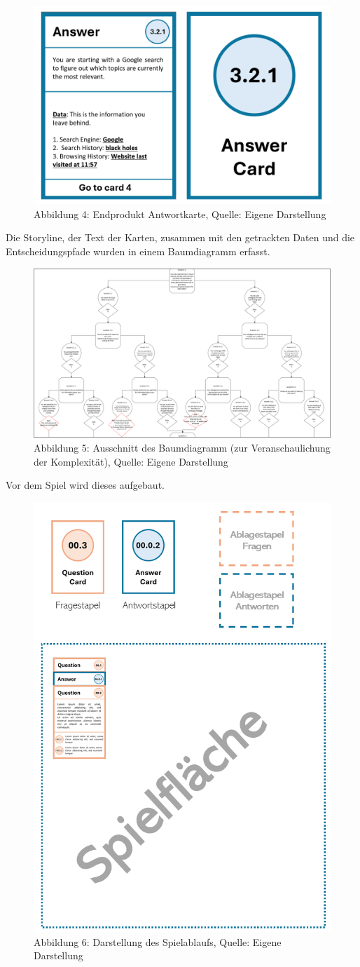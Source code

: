\documentclass[a4paper,
fontsize=11pt,
oneside,
numbers=noperiodatend,
parskip=half-,
bibliography=totoc,
final
]{scrartcl}
\begin{document}
\begin{figure}[H]
\centering
\includegraphics[width=.5\textwidth]{img/Abb4.png}
\caption{Abbildung 4: Endprodukt Antwortkarte, Quelle: Eigene
Darstellung}
\end{figure}

Die Storyline, der Text der Karten, zusammen mit den getrackten Daten
und die Entscheidungspfade wurden in einem Baumdiagramm erfasst.

\begin{figure}[H]
\centering
\includegraphics[width=1\textwidth]{img/Abb5-Baumdiagram.png}
\caption{Abbildung 5: Ausschnitt des Baumdiagramm (zur Veranschaulichung
der Komplexität), Quelle: Eigene Darstellung}
\end{figure}

Vor dem Spiel wird dieses aufgebaut.

\begin{figure}[H]
\centering
\includegraphics[width=.5\textwidth]{img/Abb6-Spielablauf.png}
\caption{Abbildung 6: Darstellung des Spielablaufs, Quelle: Eigene
Darstellung}
\end{figure}
\end{document}
